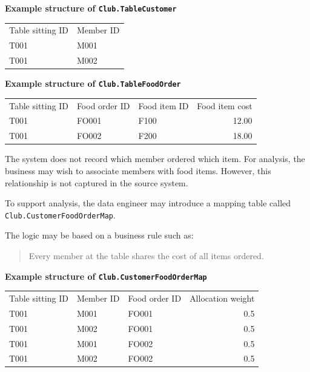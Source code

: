 \documentclass[10pt,openany,10pt]{book}
\newcounter{none}
\let\podeToprule\toprule
\let\podeMidrule\midrule
\let\podeBottomrule\bottomrule
\renewcommand{\toprule}{\arrayrulecolor{pbiGrid}\podeToprule}
\renewcommand{\midrule}{\arrayrulecolor{pbiGrid}\podeMidrule}
\renewcommand{\bottomrule}{\arrayrulecolor{pbiGrid}\podeBottomrule}
\begin{document}
\textbf{Example structure of \texttt{Club.TableCustomer}}

{\def\LTcaptype{none} %
\begin{longtable}[]{@{}ll@{}}
\toprule\noalign{}
Table sitting ID & Member ID \\
\midrule\noalign{}
\endhead
\bottomrule\noalign{}
\endlastfoot
T001 & M001 \\
T001 & M002 \\
\end{longtable}
}

\textbf{Example structure of \texttt{Club.TableFoodOrder}}

{\def\LTcaptype{none} %
\begin{longtable}[]{@{}lllr@{}}
\toprule\noalign{}
Table sitting ID & Food order ID & Food item ID & Food item cost \\
\midrule\noalign{}
\endhead
\bottomrule\noalign{}
\endlastfoot
T001 & FO001 & F100 & 12.00 \\
T001 & FO002 & F200 & 18.00 \\
\end{longtable}
}

The system does not record which member ordered which item. For
analysis, the business may wish to associate members with food items.
However, this relationship is not captured in the source system.

To support analysis, the data engineer may introduce a mapping table
called \texttt{Club.CustomerFoodOrderMap}.

The logic may be based on a business rule such as:

\begin{quote}
Every member at the table shares the cost of all items ordered.
\end{quote}

\textbf{Example structure of \texttt{Club.CustomerFoodOrderMap}}

{\def\LTcaptype{none} %
\begin{longtable}[]{@{}lllr@{}}
\toprule\noalign{}
Table sitting ID & Member ID & Food order ID & Allocation weight \\
\midrule\noalign{}
\endhead
\bottomrule\noalign{}
\endlastfoot
T001 & M001 & FO001 & 0.5 \\
T001 & M002 & FO001 & 0.5 \\
T001 & M001 & FO002 & 0.5 \\
T001 & M002 & FO002 & 0.5 \\
\end{longtable}
}
\end{document}
